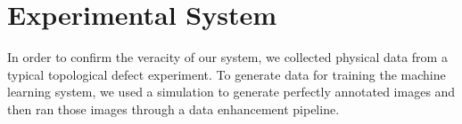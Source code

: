 \documentclass[prl,reprint,showpacs,floatfix,nofootinbib]{revtex4-1}
\begin{document}

%

\section{Experimental System}


In order to confirm the veracity of our system, we collected physical data from a typical topological defect experiment.
To generate data for training the machine learning system, we used a simulation to generate perfectly annotated images and then ran those images through a data enhancement pipeline.


\end{document}
